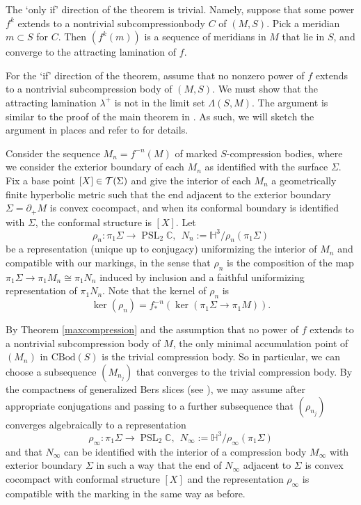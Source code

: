 \documentclass[12pt]{amsart}
\theoremstyle{definition}
\theoremstyle{remark}
\newcommand{\BC}{\mathbb C} \newcommand{\BH}{\mathbb H}
\DeclareMathOperator{\PSL}{PSL} %
\begin{document}
The `only if' direction of the theorem is trivial. Namely, suppose that some power $f^k$ extends to a nontrivial subcompressionbody $C$ of $(M,S)$. Pick a meridian $m\subset S$ for $C$. Then $(f^k(m))$ is a sequence of meridians in $M$ that lie in $S$, and converge to the attracting lamination of $f$.

 For the `if' direction of the theorem, assume that no nonzero power of $f$ extends to a nontrivial subcompression body of $(M,S)$. We must show that the attracting lamination $\lambda^+$ is not in the limit set $\Lambda(S,M)$. The argument is  similar to the proof of the main theorem in \cite {Biringerextending}.  As such, we will sketch the argument in places and refer to \cite {Biringerextending} for details.
 
 Consider the sequence  $M_n = f^{-n}(M)$ of marked $S$-compression bodies, where we consider the exterior boundary of each $M_n$ as identified with the surface $\Sigma$. Fix a base point $[X] \in \mathcal T (\Sigma) $ and give the interior of each $M_n $ a geometrically finite hyperbolic metric such that  the end adjacent to the exterior boundary $\Sigma = \partial_+M$ is convex cocompact, and when its conformal boundary is identified with $\Sigma$, the conformal structure is $[X]$. 
Let $$\rho_n : \pi_1 \Sigma \longrightarrow \PSL_2 \BC, \ \ N_n:=\BH^3/\rho_n (\pi_1 \Sigma) $$ be a representation (unique up to conjugacy) uniformizing the interior of $M_n$ and compatible with our markings, in the sense that $\rho_n$ is the composition of the map $\pi_1 \Sigma \longrightarrow \pi_1 M_n\cong \pi_1 N_n$ induced by inclusion and a faithful uniformizing representation of $\pi_1 N_n$. Note that  the kernel of $\rho_n $ is $$\ker (\rho_n) = f^ { - n }_*(\ker( \pi_1 \Sigma \to \pi_1 M)). $$

By Theorem \ref {maxcompression} and the assumption that no power of $f $  extends to a nontrivial subcompression body of $M$, the only minimal accumulation point of $(M_n)$ in $\mathrm{CBod}(S)$ is the trivial compression body. So in particular, we can choose a subsequence $(M_{n_j})$ that converges to the trivial compression body.  By the compactness of generalized Bers slices (see \cite[Theorem 4.3]{Biringerextending}), we may assume after appropriate conjugations and passing to a further subsequence that $(\rho_{n_j}) $ converges algebraically to a representation $$\rho_\infty:\pi_1 \Sigma\longrightarrow\PSL_2\BC, \ \ N_{\infty} :=\BH^ 3/\rho_\infty(\pi_1 \Sigma) $$
and that $N_\infty $ can be identified with the interior of a compression body $M_\infty$ with exterior boundary $\Sigma$ in such a way that the end of $N_\infty$ adjacent to $\Sigma$ is convex cocompact with conformal structure $[X]$ and the representation $\rho_\infty$ is compatible with the marking in the same way as before.
\end{document}
